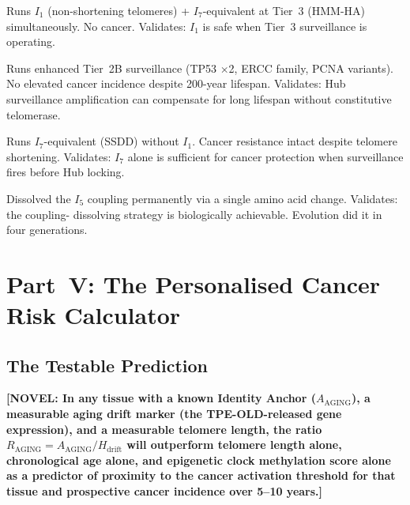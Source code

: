 \documentclass[12pt,a4paper]{article}
\newcommand{\tpeold}{TPE-OLD}
\newcommand{\novel}[1]{\textbf{[NOVEL: #1]}}
\newcommand{\Inet}[1]{$I_{#1}$}
\begin{document}
\begin{description}[leftmargin=2em]
  \item[\textbf{Naked mole rat}:] Runs \Inet{1} (non-shortening telomeres)
    + \Inet{7}-equivalent at Tier~3 (HMM-HA) simultaneously. No cancer.
    Validates: \Inet{1} is safe when Tier~3 surveillance is operating.

  \item[\textbf{Bowhead whale}:] Runs enhanced Tier~2B surveillance (TP53
    $\times$2, ERCC family, PCNA variants). No elevated cancer incidence
    despite 200-year lifespan. Validates: Hub surveillance amplification can
    compensate for long lifespan without constitutive telomerase.

  \item[\textbf{Spalax}:] Runs \Inet{7}-equivalent (SSDD) without
    \Inet{1}. Cancer resistance intact despite telomere shortening.
    Validates: \Inet{7} alone is sufficient for cancer protection when
    surveillance fires before Hub locking.

  \item[\textbf{Fore people (G127V)}:] Dissolved the \Inet{5} coupling
    permanently via a single amino acid change. Validates: the coupling-
    dissolving strategy is biologically achievable. Evolution did it in
    four generations.
\end{description}

\section{Part~V: The Personalised Cancer Risk Calculator}

\subsection{The Testable Prediction}

\novel{In any tissue with a known Identity Anchor ($A_{\mathrm{AGING}}$),
a measurable aging drift marker (the \tpeold{}-released gene expression),
and a measurable telomere length, the ratio
$R_{\mathrm{AGING}} = A_{\mathrm{AGING}} / H_{\mathrm{drift}}$ will
\textbf{outperform} telomere length alone, chronological age alone, and
epigenetic clock methylation score alone as a predictor of proximity to
the cancer activation threshold for that tissue and prospective cancer
incidence over 5--10 years.}
\end{document}
